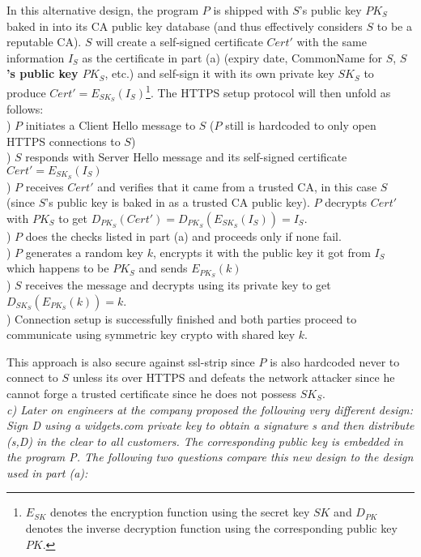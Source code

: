 In this alternative design, the program $P$ is shipped with $S$'s public key $PK_S$ baked in into its CA public key database (and thus effectively considers $S$ to be a reputable CA). $S$ will create a self-signed certificate $Cert'$ with the same information $I_S$ as the certificate in part (a) (expiry date, CommonName for $S$, \textbf{$S$'s public key $PK_S$}, etc.) and self-sign it with its own private key $SK_S$ to produce $Cert' = E_{SK_S}(I_S)$\footnote{$E_{SK}$ denotes the encryption function using the secret key $SK$ and $D_{PK}$ denotes the inverse decryption function using the corresponding public key $PK$.}. The HTTPS setup protocol will then unfold as follows:\\
) $P$ initiates a Client Hello message to $S$ ($P$ still is hardcoded to only open HTTPS connections to $S$)\\
) $S$ responds with Server Hello message and its self-signed certificate $Cert' = E_{SK_S}(I_S)$\\
) $P$ receives $Cert'$ and verifies that it came from a trusted CA, in this case $S$ (since $S$'s public key is baked in as a trusted CA public key). $P$ decrypts $Cert'$ with $PK_S$ to get $D_{PK_S}(Cert') = D_{PK_S}(E_{SK_S}(I_S)) = I_S$.\\
) $P$ does the checks listed in part (a) and proceeds only if none fail. \\
) $P$ generates a random key $k$, encrypts it with the public key it got from $I_S$ which happens to be $PK_S$ and sends $E_{PK_S}(k)$\\
) $S$ receives the message and decrypts using its private key to get $D_{SK_S}(E_{PK_S}(k)) = k$.\\
) Connection setup is successfully finished and both parties proceed to communicate using symmetric key crypto with shared key $k$. 

This approach is also secure against ssl-strip since $P$ is also hardcoded never to connect to $S$ unless its over HTTPS and defeats the network attacker since he cannot forge a trusted certificate since he does not possess $SK_S$.\\

\noindent \textit{c) Later on engineers at the company proposed the following very different design: Sign D using a widgets.com private key to obtain a signature s and then distribute (s,D) in the clear to all customers. The corresponding public key is embedded in the program P. The following two questions compare this new design to the design used in part (a):}\\

